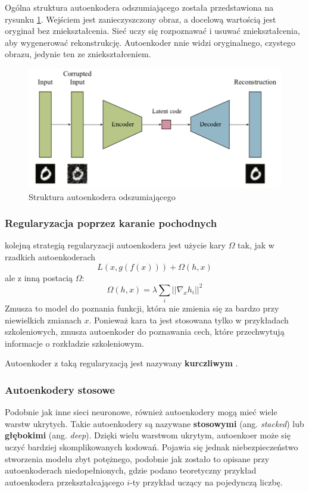 \documentclass[12pt]{mwbk}
\theoremstyle{plain}
\theoremstyle{definition}
\theoremstyle{remark}
\begin{document}
Ogólna struktura autoenkodera odszumiającego została przedstawiona na rysunku \ref{fig:denoising-structure}. Wejściem jest zanieczyszczony obraz, a docelową wartością jest oryginał bez zniekształcenia. Sieć uczy się rozpoznawać i usuwać zniekształcenia, aby wygenerować rekonstrukcję. Autoenkoder nnie widzi oryginalnego, czystego obrazu, jedynie ten ze zniekształceniem. 

\begin{figure}[!h]
	\centering
	\includegraphics[width=\linewidth]{rys/denoising_autoencoder.png}
	\caption{Struktura autoenkodera odszumiającego}
	\label{fig:denoising-structure}
\end{figure}




\subsubsection{Regularyzacja poprzez karanie pochodnych}

kolejną strategią regularyzacji autoenkodera jest użycie kary $\Omega$ tak, jak w rzadkich autoenkoderach
$$L(x, g(f(x)))+\Omega(h,x)$$
ale z inną postacią $\Omega$:
$$\Omega(h, x)=\lambda \sum_i ||\nabla_x h_i ||^2$$
Zmusza to model do poznania funkcji, która nie zmienia się za bardzo przy niewielkich zmianach $x$. Ponieważ kara ta jest stosowana tylko w przykładach szkoleniowych, zmusza autoenkoder do poznawania cech, które przechwytują informacje o rozkładzie szkoleniowym.

Autoenkoder z taką regularyzacją jest nazywany \textbf{kurczliwym} \cite{goodfellow}.
\subsubsection{Autoenkodery stosowe}


Podobnie jak inne sieci neuronowe, również autoenkodery mogą mieć wiele warstw ukrytych. Takie autoenkodery są nazywane \textbf{stosowymi} (ang. \emph{stacked}) lub \textbf{głębokimi} (ang. \emph{deep}). Dzięki wielu warstwom ukrytym, autoenkoer może się uczyć bardziej skomplikowanych kodowań. Pojawia się jednak niebezpieczeństwo stworzenia modelu zbyt potężnego, podobnie jak zostało to opisane przy autoenkoderach niedopełnionych, gdzie podano teoretyczny przykład autoenkodera przekształcającego $i$-ty przykład uczący na pojedynczą liczbę.
\end{document}
